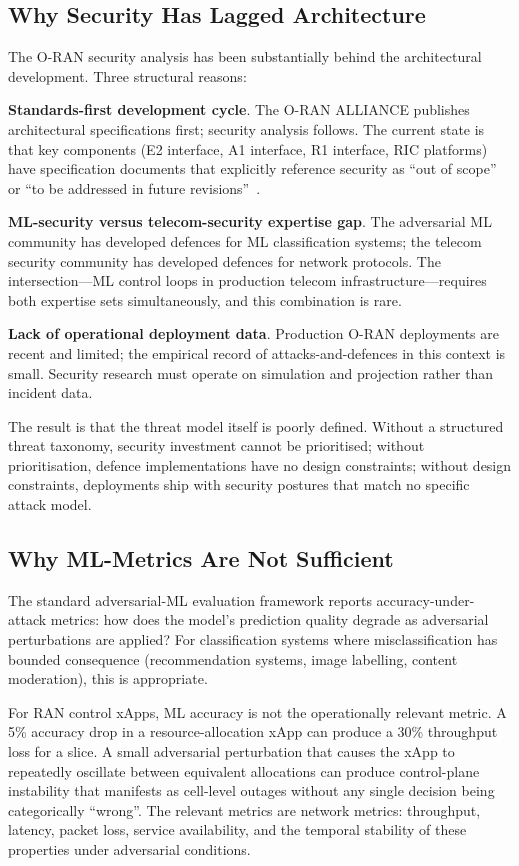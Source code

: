 \documentclass[sigconf,nonacm]{acmart}
\begin{document}
\subsection{Why Security Has Lagged Architecture}

The O-RAN security analysis has been substantially behind the
architectural development. Three structural reasons:

\textbf{Standards-first development cycle}. The O-RAN ALLIANCE
publishes architectural specifications first; security analysis
follows. The current state is that key components (E2 interface,
A1 interface, R1 interface, RIC platforms) have specification
documents that explicitly reference security as ``out of scope'' or
``to be addressed in future revisions''~\cite{ranaweera2023oransecurity}.

\textbf{ML-security versus telecom-security expertise gap}. The
adversarial ML community has developed defences for ML
classification systems; the telecom security community has
developed defences for network protocols. The intersection---ML
control loops in production telecom infrastructure---requires
both expertise sets simultaneously, and this combination is rare.

\textbf{Lack of operational deployment data}. Production O-RAN
deployments are recent and limited; the empirical record of
attacks-and-defences in this context is small. Security research
must operate on simulation and projection rather than incident
data.

The result is that the threat model itself is poorly defined.
Without a structured threat taxonomy, security investment cannot
be prioritised; without prioritisation, defence implementations
have no design constraints; without design constraints, deployments
ship with security postures that match no specific attack model.

\subsection{Why ML-Metrics Are Not Sufficient}

The standard adversarial-ML evaluation framework reports
accuracy-under-attack metrics: how does the model's prediction
quality degrade as adversarial perturbations are applied? For
classification systems where misclassification has bounded
consequence (recommendation systems, image labelling, content
moderation), this is appropriate.

For RAN control xApps, ML accuracy is not the operationally
relevant metric. A 5\% accuracy drop in a resource-allocation
xApp can produce a 30\% throughput loss for a slice. A small
adversarial perturbation that causes the xApp to repeatedly
oscillate between equivalent allocations can produce control-plane
instability that manifests as cell-level outages without any
single decision being categorically ``wrong''. The relevant
metrics are network metrics: throughput, latency, packet loss,
service availability, and the temporal stability of these
properties under adversarial conditions.
\end{document}
